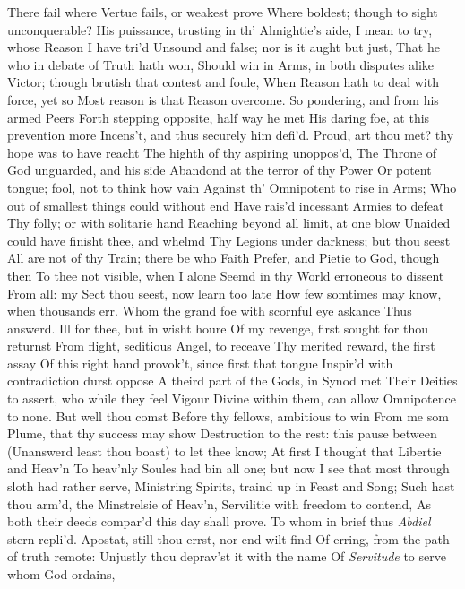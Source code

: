 \documentclass[11pt]{book}
\newcounter {first}
\begin{document}
There fail where Vertue fails, or weakest prove 
Where boldest; though to sight unconquerable? 
His puissance, trusting in th' Almightie's aide, 
I mean to try, whose Reason I have tri'd 
Unsound and false; nor is it aught but just, 
That he who in debate of Truth hath won, 
Should win in Arms, in both disputes alike 
Victor; though brutish that contest and foule, 
When Reason hath to deal with force, yet so 
Most reason is that Reason overcome. 
\quad So pondering, and from his armed Peers 
Forth stepping opposite, half way he met 
His daring foe, at this prevention more 
Incens't, and thus securely him defi'd. 
\quad Proud, art thou met? thy hope was to have reacht 
The highth of thy aspiring unoppos'd, 
The Throne of God unguarded, and his side 
Abandond at the terror of thy Power 
Or potent tongue; fool, not to think how vain 
Against th' Omnipotent to rise in Arms; 
Who out of smallest things could without end 
Have rais'd incessant Armies to defeat 
Thy folly; or with solitarie hand 
Reaching beyond all limit, at one blow 
Unaided could have finisht thee, and whelmd 
Thy Legions under darkness; but thou seest 
All are not of thy Train; there be who Faith 
Prefer, and Pietie to God, though then 
To thee not visible, when I alone 
Seemd in thy World erroneous to dissent 
From all: my Sect thou seest, now learn too late 
How few somtimes may know, when thousands err. 
\quad   Whom the grand foe with scornful eye askance 
Thus answerd.  Ill for thee, but in wisht houre 
Of my revenge, first sought for thou returnst 
From flight, seditious Angel, to receave 
Thy merited reward, the first assay 
Of this right hand provok't, since first that tongue 
Inspir'd with contradiction durst oppose 
A theird part of the Gods, in Synod met 
Their Deities to assert, who while they feel 
Vigour Divine within them, can allow 
Omnipotence to none.  But well thou comst 
Before thy fellows, ambitious to win 
From me som Plume, that thy success may show 
Destruction to the rest: this pause between 
(Unanswerd least thou boast) to let thee know; 
At first I thought that Libertie and Heav'n 
To heav'nly Soules had bin all one; but now 
I see that most through sloth had rather serve, 
Ministring Spirits, traind up in Feast and Song; 
Such hast thou arm'd, the Minstrelsie of Heav'n, 
Servilitie with freedom to contend, 
As both their deeds compar'd this day shall prove. 
\quad To whom in brief thus \textit{Abdiel} stern repli'd. 
Apostat, still thou errst, nor end wilt find 
Of erring, from the path of truth remote: 
Unjustly thou deprav'st it with the name 
Of \textit{Servitude} to serve whom God ordains, 
\end{document}
